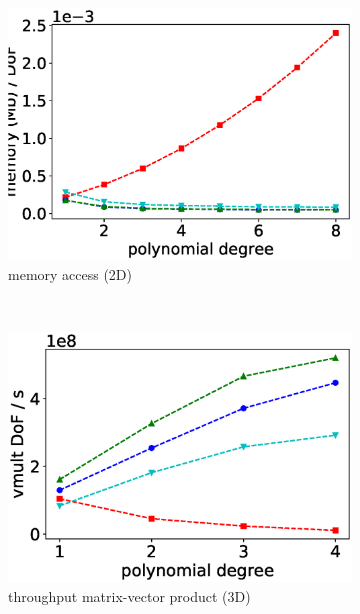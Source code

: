 \documentclass[AMA,STIX1COL]{WileyNJD-v2}
\begin{document}
\begin{figure}
\begin{subfigure}[b]{0.32\textwidth}
      \includegraphics[width=\textwidth]{CSL_Munich_memory2d-nolables.eps}
      \caption{memory access (2D)}
      \label{fig:benchmark_miehe_CSL_memory2}
  \end{subfigure}
  ~
  \begin{subfigure}[b]{0.32\textwidth}
    \centering
    \includegraphics[width=\textwidth]{CSL_Munich_throughput3d-nolables.eps}
    \caption{throughput matrix-vector product (3D)}
  \end{subfigure}
  \begin{subfigure}[b]{0.32\textwidth}
    \centering

\end{subfigure}
\end{figure}
\end{document}
